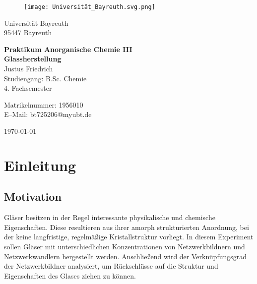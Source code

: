 \documentclass[12pt, a4paper]{article}
\begin{document}
\begin{figure}
    \texttt{[image: Universität\_Bayreuth.svg.png]}
\end{figure}



{\raggedright Universität Bayreuth\\  95447 Bayreuth}


\vspace{5cm}

\begin{center}
{\LARGE\bf{Praktikum Anorganische Chemie III}} \\  
\vspace{1cm}
{\Large\bf{Glassherstellung}}\\
\vspace{0.5cm}
{\large Justus Friedrich\\}
{Studiengang: B.Sc. Chemie\\}
{4. Fachsemester}
\end{center}





\thispagestyle{empty}
\begin{center}
{\small Matrikelnummer: 1956010 \\
E–Mail:  bt725206@myubt.de}
\end{center}

\vspace{5cm}

\today


\newpage
\tableofcontents
\thispagestyle{empty}


\newpage
\setcounter{page}{1}
\section{Einleitung}



\subsection{Motivation}
Gläser besitzen in der Regel interessante physikalische und chemische Eigenschaften. Diese resultieren aus ihrer amorph strukturierten Anordnung, 
bei der keine langfristige, regelmäßige Kristallstruktur vorliegt. In diesem Experiment sollen Gläser mit unterschiedlichen Konzentrationen von Netzwerkbildnern und Netzwerkwandlern 
hergestellt werden. Anschließend wird der Verknüpfungsgrad der Netzwerkbildner analysiert, um Rückschlüsse auf die Struktur und Eigenschaften des Glases ziehen zu können. \cite{Skript}
\end{document}
